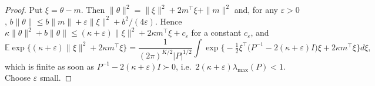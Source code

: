 \documentclass[10pt,a4paper]{amsart}
\newcommand{\E}{\mathbb{E}}
\newcommand{\T}{^{\top}}
\begin{document}
\begin{proof}
Put $\xi=\theta-m$. Then $\|\theta\|^2=\|\xi\|^2+2m\T\xi+\|m\|^2$ and, for any $\varepsilon>0$, $b\|\theta\|\le b\|m\|+\varepsilon\|\xi\|^2+b^2/(4\varepsilon)$. Hence $\kappa\|\theta\|^2+b\|\theta\|\le(\kappa+\varepsilon)\|\xi\|^2+2\kappa m\T\xi+c_\varepsilon$ for a constant $c_\varepsilon$, and
\[
\E\exp\{(\kappa+\varepsilon)\|\xi\|^2+2\kappa m\T\xi\}=\frac{1}{(2\pi)^{K/2}|P|^{1/2}}\int\exp\Big\{-\tfrac12\xi\T\big(P^{-1}-2(\kappa+\varepsilon)I\big)\xi+2\kappa m\T\xi\Big\}d\xi ,
\]
which is finite as soon as $P^{-1}-2(\kappa+\varepsilon)I\succ0$, i.e.\ $2(\kappa+\varepsilon)\lambda_{\max}(P)<1$. Choose $\varepsilon$ small.
\end{proof}
\end{document}
